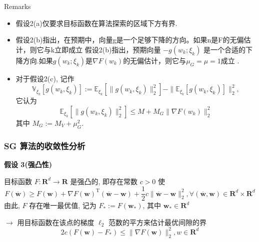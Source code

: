 \documentclass[handout]{beamer}
\begin{document}
\begin{frame}
{\color{dblue}Remarks}
\begin{itemize}
%
\item 假设2(a)仅要求目标函数在算法探索的区域下方有界.

\item 假设2(b)指出，在预期中，向量g是一个足够下降的方向。如果n是F的无偏估计，则它与k立即成立 假设2(b)指出，预期向量 $-g(w_k; \xi_k)$ 是一个合适的下降方向.如果$g(w_k; \xi_k)$是$\nabla F(w_k)$的无偏估计，则它与$\mu_G = \mu = 1$成立 .

\item 对于假设2(c), 记作
$$\mathbb{V}_{\xi_k}[g(w_k, \xi_k)] := \mathbb{E}_{\xi_k}[\|g(w_k,\xi_k)\|^2_2] - \|\mathbb{E}_{\xi_k}[g(w_k, \xi_k)]\|^2_2,$$
它认为
$$\mathbb{E}_{\xi_k}[\|g(w_k, \xi_k)\|^2_2] \leq M + M_G\|\nabla F(w_k)\|^2_2$$
其中 $M_G := M_V + \mu^2_G.$

\end{itemize}
\end{frame}

\begin{frame}
\frametitle {SG 算法的收敛性分析}

\textbf{假设 3(强凸性)} 

目标函数 $F: \mathbf{R}^d \rightarrow \mathbf{R}$ 是强凸的, 即存在常数 $c>0$ 使
$$
F(\overline{\boldsymbol{w}}) \geqslant F(\boldsymbol{w})+\nabla F(\boldsymbol{w})^{\mathrm{T}}(\overline{\boldsymbol{w}}-\boldsymbol{w})+\frac{1}{2} c\|\overline{\boldsymbol{w}}-\boldsymbol{w}\|_2^2, \forall(\overline{\boldsymbol{w}}, \boldsymbol{w}) \in \mathbf{R}^d \times \mathbf{R}^d
$$
由此, $F$ 存在唯一最优值, 记为 $F_*:=F\left(\boldsymbol{w}_*\right)$, 其中 $\boldsymbol{w}_* \in \mathbf{R}^d$

\bigskip

$\rightarrow$ 用目标函数在该点的梯度 $\ell_2$ 范数的平方来估计最优间隙的界
$$
2 c\left(F(\boldsymbol{w})-F_*\right) \leqslant\|\nabla F(\boldsymbol{w})\|_2^2, w \in \mathbf{R}^d
$$

\end{frame}
\end{document}
